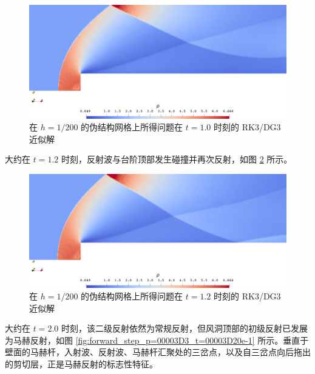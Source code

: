 \begin{figure}[h!]
\begin{centering}
\includegraphics[width=1\textwidth,height=0.28\textheight]{../mdpi/figures/forward_step/p=3_t=10e-1}
\par\end{centering}
\caption{\label{fig:forward_step_p=00003D3_t=00003D10e-1}在 $h=1/200$ 的伪结构网格上所得问题在
$t=1.0$ 时刻的 RK3/DG3 近似解}
\end{figure}

\newpage{}

大约在 $t=1.2$ 时刻，反射波与台阶顶部发生碰撞并再次反射，如图 \ref{fig:forward_step_p=00003D3_t=00003D12e-1}
所示。

\begin{figure}[h!]
\begin{centering}
\includegraphics[width=1\textwidth,height=0.28\textheight]{../mdpi/figures/forward_step/p=3_t=12e-1}
\par\end{centering}
\caption{\label{fig:forward_step_p=00003D3_t=00003D12e-1}在 $h=1/200$ 的伪结构网格上所得问题在
$t=1.2$ 时刻的 RK3/DG3 近似解}
\end{figure}

大约在 $t=2.0$ 时刻，该二级反射依然为常规反射，但风洞顶部的初级反射已发展为马赫反射，如图 \ref{fig:forward_step_p=00003D3_t=00003D20e-1}
所示。垂直于壁面的马赫杆，入射波、反射波、马赫杆汇聚处的三岔点，以及自三岔点向后拖出的剪切层，正是马赫反射的标志性特征。

